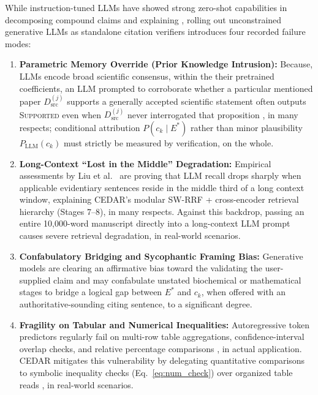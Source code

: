 \documentclass[journal]{IEEEtran}
\begin{document}
While instruction-tuned LLMs have showed strong zero-shot capabilities in decomposing compound claims \cite{kamoi2023wice,min2023factscore} and explaining \cite{gao2023enabling,rashkin2023measuring}, rolling out unconstrained generative LLMs as standalone citation verifiers introduces four recorded failure modes:
\begin{enumerate}
\item \textbf{Parametric Memory Override (Prior Knowledge Intrusion):} Because, LLMs encode broad scientific consensus, within the their pretrained coefficients, an LLM prompted to corroborate whether a particular mentioned paper $D_{\text{src}}^{(j)}$ supports a generally accepted scientific statement often outputs \textsc{Supported} even when $D_{\text{src}}^{(j)}$ never interrogated that proposition \cite{rashkin2023measuring,gao2023enabling}, in many respects; conditional attribution $P(c_k \mid E^*)$ rather than minor plausibility $P_{\text{LLM}}(c_k)$ must strictly be measured by verification, on the whole.
\item \textbf{Long-Context ``Lost in the Middle'' Degradation:} Empirical assessments by Liu et al.\ \cite{liu2024lost} are proving that LLM recall drops sharply when applicable evidentiary sentences reside in the middle third of a long context window, explaining CEDAR's modular SW-RRF + cross-encoder retrieval hierarchy (Stages 7--8), in many respects. Against this backdrop, passing an entire 10,000-word manuscript directly into a long-context LLM prompt causes severe retrieval degradation, in real-world scenarios.
\item \textbf{Confabulatory Bridging and Sycophantic Framing Bias:} Generative models are clearing an affirmative bias toward the validating the user-supplied claim and may confabulate unstated biochemical or mathematical stages to bridge a logical gap between $E^*$ and $c_k$, when offered with an authoritative-sounding citing sentence, to a significant degree.
\item \textbf{Fragility on Tabular and Numerical Inequalities:} Autoregressive token predictors regularly fail on multi-row table aggregations, confidence-interval overlap checks, and relative percentage comparisons \cite{lu2023scitab,akhtar2023reading}, in actual application. CEDAR mitigates this vulnerability by delegating quantitative comparisons to symbolic inequality checks (Eq.~\ref{eq:num_check}) over organized table reads \cite{herzig2020tapas}, in real-world scenarios.
\end{enumerate}
\end{document}
